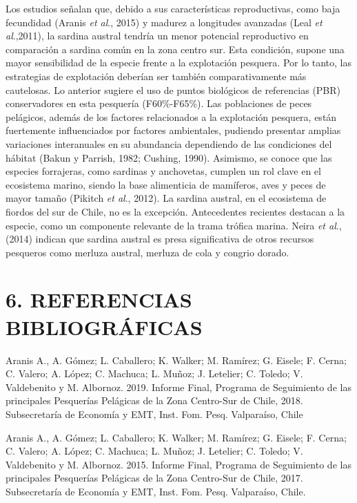 \documentclass[
  spanish,
]{article}
\begin{document}
Los estudios señalan que, debido a sus características reproductivas,
como baja fecundidad (Aranis \emph{et al}., 2015) y madurez a longitudes
avanzadas (Leal \emph{et al}.,2011), la sardina austral tendría un menor
potencial reproductivo en comparación a sardina común en la zona centro
sur. Esta condición, supone una mayor sensibilidad de la especie frente
a la explotación pesquera. Por lo tanto, las estrategias de explotación
deberían ser también comparativamente más cautelosas. Lo anterior
sugiere el uso de puntos biológicos de referencias (PBR) conservadores
en esta pesquería (F60\%-F65\%). Las poblaciones de peces pelágicos,
además de los factores relacionados a la explotación pesquera, están
fuertemente influenciados por factores ambientales, pudiendo presentar
amplias variaciones interanuales en su abundancia dependiendo de las
condiciones del hábitat (Bakun y Parrish, 1982; Cushing, 1990).
Asimismo, se conoce que las especies forrajeras, como sardinas y
anchovetas, cumplen un rol clave en el ecosistema marino, siendo la base
alimenticia de mamíferos, aves y peces de mayor tamaño (Pikitch \emph{et
al}., 2012). La sardina austral, en el ecosistema de fiordos del sur de
Chile, no es la excepción. Antecedentes recientes destacan a la especie,
como un componente relevante de la trama trófica marina. Neira \emph{et
al}., (2014) indican que sardina austral es presa significativa de otros
recursos pesqueros como merluza austral, merluza de cola y congrio
dorado.

\pagebreak

\hypertarget{referencias-bibliogruxe1ficas}{%
\section{6. REFERENCIAS
BIBLIOGRÁFICAS}\label{referencias-bibliogruxe1ficas}}

Aranis A., A. Gómez; L. Caballero; K. Walker; M. Ramírez; G. Eisele; F.
Cerna; C. Valero; A. López; C. Machuca; L. Muñoz; J. Letelier; C.
Toledo; V. Valdebenito y M. Albornoz. 2019. Informe Final, Programa de
Seguimiento de las principales Pesquerías Pelágicas de la Zona
Centro-Sur de Chile, 2018. Subsecretaría de Economía y EMT, Inst. Fom.
Pesq. Valparaíso, Chile

Aranis A., A. Gómez; L. Caballero; K. Walker; M. Ramírez; G. Eisele; F.
Cerna; C. Valero; A. López; C. Machuca; L. Muñoz; J. Letelier; C.
Toledo; V. Valdebenito y M. Albornoz. 2015. Informe Final, Programa de
Seguimiento de las principales Pesquerías Pelágicas de la Zona
Centro-Sur de Chile, 2017. Subsecretaría de Economía y EMT, Inst. Fom.
Pesq. Valparaíso, Chile.
\end{document}
